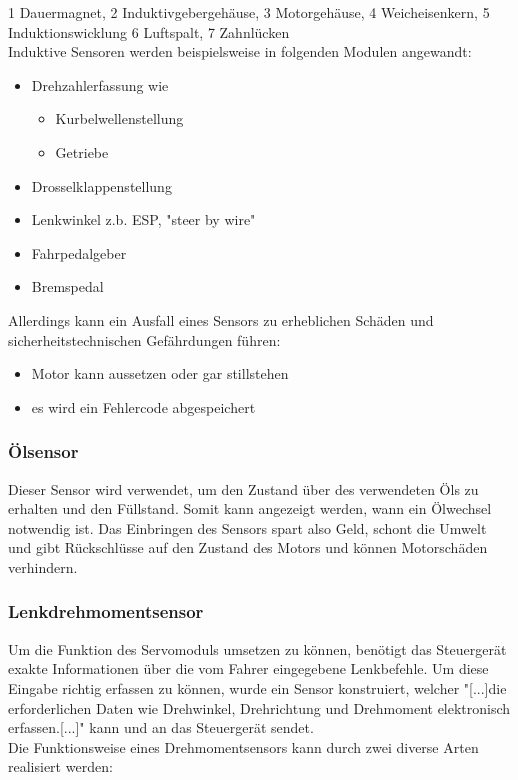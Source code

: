 				\begin{flushleft}
					1 Dauermagnet, 2 Induktivgebergehäuse, 3 Motorgehäuse, 4 Weicheisenkern, 5 Induktionswicklung 6 Luftspalt, 7 Zahnlücken\\
					Induktive Sensoren werden beispielsweise in folgenden Modulen angewandt:
					
					\begin{itemize}
						\item Drehzahlerfassung wie
							\begin{itemize}
								\item Kurbelwellenstellung
								\item Getriebe
							\end{itemize}	
						\item Drosselklappenstellung
						\item Lenkwinkel z.b. ESP, "steer by wire"
						\item Fahrpedalgeber
						\item Bremspedal
					\end{itemize}
				
					Allerdings kann ein Ausfall eines Sensors zu erheblichen Schäden und sicherheitstechnischen Gefährdungen führen:
					\begin{itemize}
						\item Motor kann aussetzen oder gar stillstehen
						\item es wird ein Fehlercode abgespeichert
					\end{itemize}	
				\end{flushleft}				
		
			\subsubsection{Ölsensor}
				\begin{flushleft}
					
					Dieser Sensor wird verwendet, um den Zustand über des verwendeten Öls zu erhalten und den Füllstand. Somit kann angezeigt werden, wann ein Ölwechsel notwendig ist. Das Einbringen des Sensors spart also Geld, schont die Umwelt und gibt Rückschlüsse auf den Zustand des Motors und können Motorschäden verhindern.\cite{TS10}

				\end{flushleft}		
		
			\subsubsection{Lenkdrehmomentsensor}
				Um die Funktion des Servomoduls umsetzen zu können, benötigt das Steuergerät exakte Informationen über die vom Fahrer eingegebene Lenkbefehle. Um diese Eingabe richtig erfassen zu können, wurde ein Sensor konstruiert, welcher "[...]die erforderlichen Daten wie Drehwinkel, Drehrichtung und Drehmoment elektronisch erfassen.[...]"\cite{TS11} kann und an das Steuergerät sendet.\\
				Die Funktionsweise eines Drehmomentsensors kann durch zwei diverse Arten realisiert werden:\\
				

